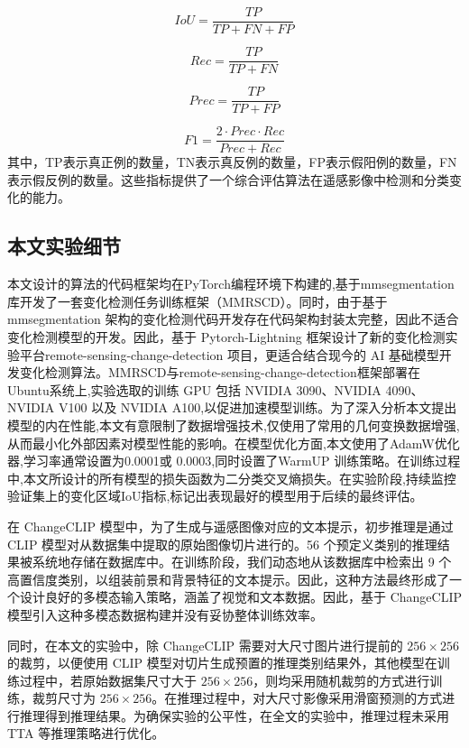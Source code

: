 \begin{equation}
IoU = \frac{TP}{TP + FN + FP}
\end{equation}

\begin{equation}
Rec = \frac{TP}{TP + FN}
\end{equation}

\begin{equation}
Prec = \frac{TP}{TP + FP}
\end{equation}

\begin{equation}
F1 = \frac{2 \cdot Prec \cdot Rec}{Prec + Rec}
\end{equation}
其中，TP表示真正例的数量，TN表示真反例的数量，FP表示假阳例的数量，FN表示假反例的数量。这些指标提供了一个综合评估算法在遥感影像中检测和分类变化的能力。

\subsection{本文实验细节}

本文设计的算法的代码框架均在PyTorch编程环境下构建的,基于mmsegmentation库开发了一套变化检测任务训练框架（MMRSCD）。同时，由于基于mmsegmentation 架构的变化检测代码开发存在代码架构封装太完整，因此不适合变化检测模型的开发。因此，基于 Pytorch-Lightning 框架设计了新的变化检测实验平台remote-sensing-change-detection 项目，更适合结合现今的 AI 基础模型开发变化检测算法。MMRSCD与remote-sensing-change-detection框架部署在Ubuntu系统上,实验选取的训练 GPU 包括 NVIDIA 3090、NVIDIA 4090、NVIDIA V100 以及 NVIDIA A100,以促进加速模型训练。为了深入分析本文提出模型的内在性能,本文有意限制了数据增强技术,仅使用了常用的几何变换数据增强,从而最小化外部因素对模型性能的影响。在模型优化方面,本文使用了AdamW优化器,学习率通常设置为0.0001或 0.0003,同时设置了WarmUP 训练策略。在训练过程中,本文所设计的所有模型的损失函数为二分类交叉熵损失。在实验阶段,持续监控验证集上的变化区域IoU指标,标记出表现最好的模型用于后续的最终评估。

在 ChangeCLIP 模型中，为了生成与遥感图像对应的文本提示，初步推理是通过 CLIP 模型对从数据集中提取的原始图像切片进行的。56 个预定义类别的推理结果被系统地存储在数据库中。在训练阶段，我们动态地从该数据库中检索出 9 个高置信度类别，以组装前景和背景特征的文本提示。因此，这种方法最终形成了一个设计良好的多模态输入策略，涵盖了视觉和文本数据。因此，基于 ChangeCLIP 模型引入这种多模态数据构建并没有妥协整体训练效率。

同时，在本文的实验中，除 ChangeCLIP 需要对大尺寸图片进行提前的 $256\times 256$ 的裁剪，以便使用 CLIP 模型对切片生成预置的推理类别结果外，其他模型在训练过程中，若原始数据集尺寸大于 $256\times 256$，则均采用随机裁剪的方式进行训练，裁剪尺寸为 $256\times 256$。在推理过程中，对大尺寸影像采用滑窗预测的方式进行推理得到推理结果。为确保实验的公平性，在全文的实验中，推理过程未采用 TTA 等推理策略进行优化。

